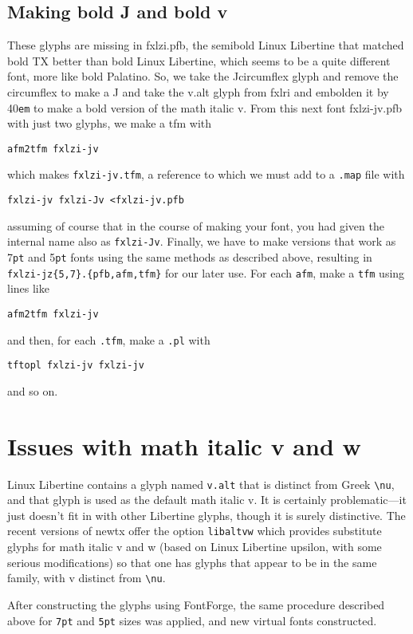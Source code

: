 \documentclass[10pt]{amsart}
\begin{document}
\subsection{Making bold J and bold v}
These glyphs are missing in \textsf{fxlzi.pfb}, the semibold Linux Libertine that matched bold TX better than bold Linux Libertine, which seems to be a quite different font, more like bold Palatino. So, we take the Jcircumflex glyph and remove the circumflex to make a J and take the v.alt glyph from \textsf{fxlri} and embolden it by 40{\tt em} to make a bold version of the math italic v. From this next font \textsf{fxlzi-jv.pfb} with just two glyphs, we make a tfm with
\begin{verbatim}
afm2tfm fxlzi-jv 
\end{verbatim}
which makes {\tt fxlzi-jv.tfm}, a reference to which we must add to a {\tt .map} file with
\begin{verbatim}
fxlzi-jv fxlzi-Jv <fxlzi-jv.pfb
\end{verbatim}
assuming of course that in the course of making your font, you had given the internal name also as {\tt fxlzi-Jv}. Finally, we have to make versions that work as 7{\tt pt} and 5{\tt pt} fonts using the same methods as described above, resulting in \verb|fxlzi-jz{5,7}.{pfb,afm,tfm}| for our later use. For each {\tt afm}, make a {\tt tfm} using lines like
\begin{verbatim}
afm2tfm fxlzi-jv
\end{verbatim}
and then, for each {\tt.tfm}, make a {\tt .pl} with 
\begin{verbatim}
tftopl fxlzi-jv fxlzi-jv
\end{verbatim}
and so on. 
\section{Issues with math italic v and w}
Linux Libertine contains a glyph named {\tt v.alt} that is distinct from Greek \verb|\nu|, and that glyph is used as the default math italic v. It is certainly problematic---it just doesn't fit in with other Libertine glyphs, though it is surely distinctive. The recent versions of \textsf{newtx} offer the option {\tt libaltvw} which provides substitute glyphs for math italic v and w (based on Linux Libertine \textsf{upsilon}, with some serious modifications) so that one has glyphs that appear to be in the same family, with v distinct from \verb|\nu|.

After constructing the glyphs using FontForge, the same procedure described above for {\tt7pt} and {\tt5pt} sizes was applied, and new virtual fonts constructed.
\end{document}
